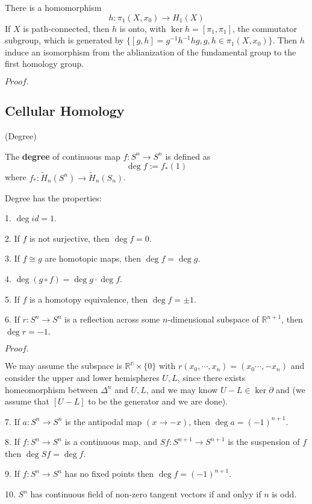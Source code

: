 \documentclass{article}
\newcommand{\Pf}[1]{$Proof.$\par}
\begin{document}
\begin{theorem}
    There is a homomorphism
    \[h:\pi_1(X,x_0) \to H_1(X)\]
    If $X$ is path-connected, then $h$ is onto, with $\ker h = [\pi_1,\pi_1]$, the commutator subgroup, which is generated by $\{[g,h] = g^{-1}h^{-1}hg, g,h\in \pi_1(X,x_0)\}$. Then $h$ induce an isomorphism from the ablianization of the fundamental group to the first homology group.
\end{theorem}
\Pf\par

\subsection{Cellular Homology}

\begin{definition}(Degree)\par
    The \textbf{degree} of continuous map $f:S^n\to S^n$ is defined as
    \[
    \deg f:=f_*(1)
    \]
    where $f_*:\widetilde{H}_n(S^n) \to \widetilde{H}_n(S_n)$.
\end{definition}

Degree has the properties:\par
1. $\deg id = 1$.\par
2. If $f$ is not surjective, then $\deg f = 0$.\par
3. If $f \cong g$ are homotopic maps, then $\deg f = \deg g$.\par
4. $\deg (g\circ f) = \deg g \cdot \deg f$.\par
5. If $f$ is a homotopy equivalence, then $\deg f = \pm 1$.\par
6. If $r:S^n\to S^n$ is a reflection across some $n$-dimensional subspace of $\mathbb{R}^{n+1}$, then $\deg r = -1$.\par
\Pf\par
    We may assume the subspace is $\mathbb{R^n}\times\{0\}$ with $r(x_0,\cdots,x_n) = (x_0\cdots,-x_n)$
    and consider the upper and lower hemispheres $U,L$, since there exists homeomorphism between $\Delta^n$ and $U,L$, and we may know $U-L\in \ker\partial$ and (we assume that $[U-L]$ to be the generator and we are done).\par
7. If $a:S^n \to S^n$ is the antipodal map $(x\to -x)$, then $\deg a = (-1)^{n+1}$.\par
8. If $f:S^n\to S^n$ is a continuous map, and $Sf:S^{n+1} \to S^{n+1}$ is the suspension of $f$ then $\deg Sf = \deg f$.\par
9. If $f:S^n \to S^n$ has no fixed points then $\deg f = (-1)^{n+1}$.\par
10. $S^n$ has continuous field of non-zero tangent vectors if and onlyy if $n$ is odd.
\end{document}
